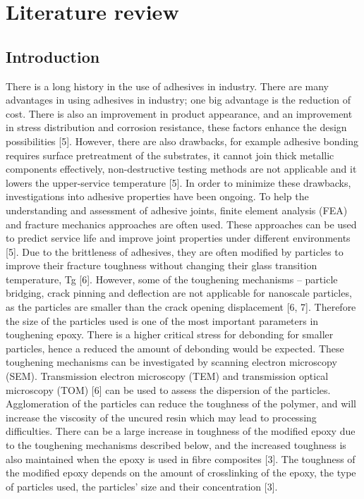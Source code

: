 \documentclass[numbers=noendperiod,chapterprefix=on]{icldt} %
\begin{document}



\chapter{Literature review}
\section{Introduction}
There is a long history in the use of adhesives in industry. There are many advantages in using adhesives in industry; one big advantage is the reduction of cost. There is also an improvement in product appearance, and an improvement in stress distribution and corrosion resistance, these factors enhance the design possibilities [5]. However, there are also drawbacks, for example adhesive bonding requires surface pretreatment of the substrates, it cannot join thick metallic components effectively, non-destructive testing methods are not applicable and it lowers the upper-service temperature [5]. 
In order to minimize these drawbacks, investigations into adhesive properties have been ongoing. To help the understanding and assessment of adhesive joints, finite element analysis (FEA) and fracture mechanics approaches are often used. These approaches can be used to predict service life and improve joint properties under different environments [5]. 
Due to the brittleness of adhesives, they are often modified by particles to improve their fracture toughness without changing their glass transition temperature, Tg [6]. However, some of the toughening mechanisms – particle bridging, crack pinning and deflection are not applicable for nanoscale particles, as the particles are smaller than the crack opening displacement [6, 7]. Therefore the size of the particles used is one of the most important parameters in toughening epoxy. There is a higher critical stress for debonding for smaller particles, hence a reduced the amount of debonding would be expected. These toughening mechanisms can be investigated by scanning electron microscopy (SEM). Transmission electron microscopy (TEM) and transmission optical microscopy (TOM) [6] can be used to assess the dispersion of the particles. Agglomeration of the particles can reduce the toughness of the polymer, and will increase the viscosity of the uncured resin which may lead to processing difficulties. There can be a large increase in toughness of the modified epoxy due to the toughening mechanisms described below, and the increased toughness is also maintained when the epoxy is used in fibre composites [3]. The toughness of the modified epoxy depends on the amount of crosslinking of the epoxy, the type of particles used, the particles’ size and their concentration [3]. 
\end{document}

